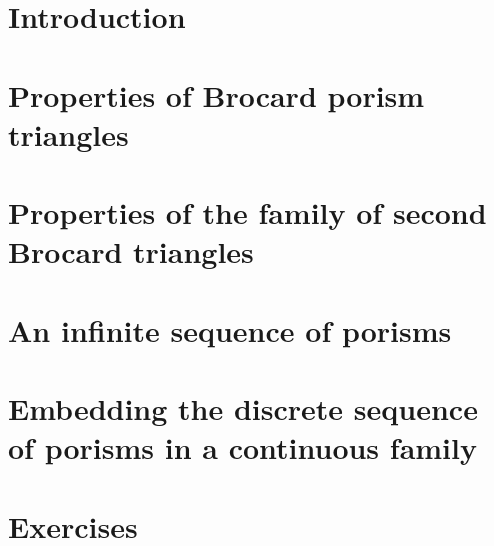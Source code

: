 
\section{ Introduction}
\label{sec:06_introd}


\section{Properties of Brocard porism triangles}
\label{sec:review}


\section[Properties of second Brocard triangles]{Properties of the family of second Brocard triangles}
\label{sec:broc-second}


\section{An infinite sequence of porisms}
\label{sec:porism-seq}


\section[Embedding of porisms in a continuous family]{Embedding the discrete sequence of porisms in a continuous family}
\label{sec:continuous}


 

\section{Exercises}
\label{sec:06-exercises}



